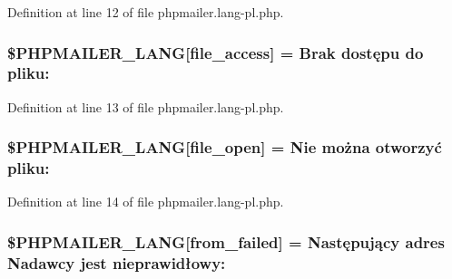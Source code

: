 Definition at line 12 of file phpmailer.\+lang-\/pl.\+php.

\subsubsection[{\texorpdfstring{\$\+P\+H\+P\+M\+A\+I\+L\+E\+R\+\_\+\+L\+A\+NG}{$PHPMAILER_LANG}}]{\setlength{\rightskip}{0pt plus 5cm}\$P\+H\+P\+M\+A\+I\+L\+E\+R\+\_\+\+L\+A\+NG\mbox{[}\textquotesingle{}file\+\_\+access\textquotesingle{}\mbox{]} = \textquotesingle{}Brak dostępu do pliku\+: \textquotesingle{}}\hypertarget{phpmailer_8lang-pl_8php_a7e83349023b856ef9e5c46e30ae6d51e}{}\label{phpmailer_8lang-pl_8php_a7e83349023b856ef9e5c46e30ae6d51e}


Definition at line 13 of file phpmailer.\+lang-\/pl.\+php.

\subsubsection[{\texorpdfstring{\$\+P\+H\+P\+M\+A\+I\+L\+E\+R\+\_\+\+L\+A\+NG}{$PHPMAILER_LANG}}]{\setlength{\rightskip}{0pt plus 5cm}\$P\+H\+P\+M\+A\+I\+L\+E\+R\+\_\+\+L\+A\+NG\mbox{[}\textquotesingle{}file\+\_\+open\textquotesingle{}\mbox{]} = \textquotesingle{}Nie można otworzyć pliku\+: \textquotesingle{}}\hypertarget{phpmailer_8lang-pl_8php_a28d1a6517bf4c942a0ddd506188ad2e0}{}\label{phpmailer_8lang-pl_8php_a28d1a6517bf4c942a0ddd506188ad2e0}


Definition at line 14 of file phpmailer.\+lang-\/pl.\+php.

\subsubsection[{\texorpdfstring{\$\+P\+H\+P\+M\+A\+I\+L\+E\+R\+\_\+\+L\+A\+NG}{$PHPMAILER_LANG}}]{\setlength{\rightskip}{0pt plus 5cm}\$P\+H\+P\+M\+A\+I\+L\+E\+R\+\_\+\+L\+A\+NG\mbox{[}\textquotesingle{}from\+\_\+failed\textquotesingle{}\mbox{]} = \textquotesingle{}Następujący adres Nadawcy jest nieprawidłowy\+: \textquotesingle{}}\hypertarget{phpmailer_8lang-pl_8php_adf832ae12155a09be077c6d5e4fd7e22}{}\label{phpmailer_8lang-pl_8php_adf832ae12155a09be077c6d5e4fd7e22}


